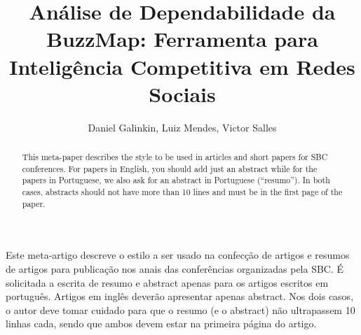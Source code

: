 \documentclass[12pt]{article}
\title{Análise de Dependabilidade da BuzzMap: Ferramenta para Inteligência
Competitiva em Redes Sociais}
\author{Daniel Galinkin\inst{1}, Luiz Mendes\inst{1}, Victor Salles\inst{1}}
\begin{document}
 

\maketitle

\begin{abstract}
  This meta-paper describes the style to be used in articles and short papers
  for SBC conferences. For papers in English, you should add just an abstract
  while for the papers in Portuguese, we also ask for an abstract in
  Portuguese (``resumo''). In both cases, abstracts should not have more than
  10 lines and must be in the first page of the paper.
\end{abstract}
     
\begin{resumo} 
  Este meta-artigo descreve o estilo a ser usado na confecção de artigos e
  resumos de artigos para publicação nos anais das conferências organizadas
  pela SBC. É solicitada a escrita de resumo e abstract apenas para os artigos
  escritos em português. Artigos em inglês deverão apresentar apenas abstract.
  Nos dois casos, o autor deve tomar cuidado para que o resumo (e o abstract)
  não ultrapassem 10 linhas cada, sendo que ambos devem estar na primeira
  página do artigo.
\end{resumo}











\nocite{*}


\end{document}
